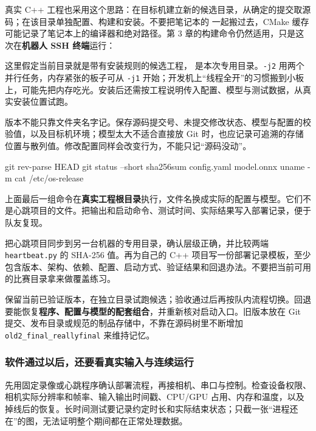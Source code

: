 真实 C++ 工程也采用这个思路：在目标机建立新的候选目录，从确定的提交取源码；在该目录单独配置、构建和安装。不要把笔记本的  一起搬过去，CMake 缓存可能记录了笔记本上的编译器和绝对路径。第 3 章的构建命令仍然适用，只是这次在\textbf{机器人 SSH 终端}运行：
这里假定当前目录就是带有安装规则的候选工程， 是本次专用目录。\texttt{-j2} 用两个并行任务，内存紧张的板子可从 \texttt{-j1} 开始；开发机上“线程全开”的习惯搬到小板上，可能先把内存吃光。安装后还需按工程说明传入配置、模型与测试数据，从真实安装位置试跑。

版本不能只靠文件夹名字记。保存源码提交号、未提交修改状态、模型与配置的校验值，以及目标机环境；模型太大不适合直接放 Git 时，也应记录可追溯的存储位置与散列值。修改配置同样会改变行为，不能只记“源码没动”。

\begin{tbash}
git rev-parse HEAD
git status --short
sha256sum config.yaml model.onnx
uname -m
cat /etc/os-release
\end{tbash}
上面最后一组命令在\textbf{真实工程根目录}执行，文件名换成实际的配置与模型。它们不是心跳项目的文件。把输出和启动命令、测试时间、实际结果写入部署记录，便于队友复现。

\begin{exercise}\label{ex:deploy-delivery}
把心跳项目同步到另一台机器的专用目录，确认层级正确，并比较两端 \texttt{heartbeat.py} 的 SHA-256 值。再为自己的 C++ 项目写一份部署记录模板，至少包含版本、架构、依赖、配置、启动方式、验证结果和回退办法。不要把当前可用的比赛目录拿来做覆盖练习。
\end{exercise}

\begin{conclusion}
保留当前已验证版本，在独立目录试跑候选；验收通过后再按队内流程切换。回退要能恢复\textbf{程序、配置与模型的配套组合}，并重新核对启动入口。旧版本放在 Git 提交、发布目录或规范的制品存储中，不靠在源码树里不断增加 \texttt{old2\_final\_reallyfinal} 来维持记忆。
\end{conclusion}

\subsubsection{软件通过以后，还要看真实输入与连续运行}

先用固定录像或心跳程序确认部署流程，再接相机、串口与控制。检查设备权限、相机实际分辨率和帧率、输入输出时间戳、CPU/GPU 占用、内存和温度，以及掉线后的恢复。长时间测试要记录约定时长和实际结束状态；只截一张“进程还在”的图，无法证明整个期间都在正常处理数据。

